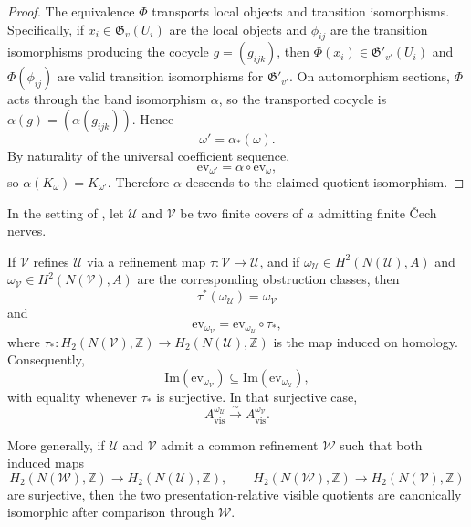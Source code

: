 \begin{proof}
The equivalence $\Phi$ transports local objects and transition isomorphisms. Specifically, if $x_i\in\mathfrak G_v(U_i)$ are the local objects and $\phi_{ij}$ are the transition isomorphisms producing the cocycle $g=(g_{ijk})$, then $\Phi(x_i)\in\mathfrak G'_{v'}(U_i)$ and $\Phi(\phi_{ij})$ are valid transition isomorphisms for $\mathfrak G'_{v'}$. On automorphism sections, $\Phi$ acts through the band isomorphism $\alpha$, so the transported cocycle is $\alpha(g)=(\alpha(g_{ijk}))$. Hence
\[
\omega'=\alpha_*(\omega).
\]
By naturality of the universal coefficient sequence,
\[
\mathrm{ev}_{\omega'}=\alpha\circ \mathrm{ev}_{\omega},
\]
so $\alpha(K_{\omega})=K_{\omega'}$. Therefore $\alpha$ descends to the claimed quotient isomorphism.
\end{proof}

\begin{proposition}\label{prop:visible-quotient-refinement-invariance}
In the setting of , let $\mathcal U$ and $\mathcal V$ be two finite covers of $a$ admitting finite \v{C}ech nerves.

If $\mathcal V$ refines $\mathcal U$ via a refinement map $\tau:\mathcal V\to\mathcal U$, and if $\omega_{\mathcal U}\in H^2(N(\mathcal U),A)$ and $\omega_{\mathcal V}\in H^2(N(\mathcal V),A)$ are the corresponding obstruction classes, then
\[
\tau^*(\omega_{\mathcal U})=\omega_{\mathcal V}
\]
and
\[
\mathrm{ev}_{\omega_{\mathcal V}}=\mathrm{ev}_{\omega_{\mathcal U}}\circ \tau_*,
\]
where $\tau_*:H_2(N(\mathcal V),\mathbb Z)\to H_2(N(\mathcal U),\mathbb Z)$ is the map induced on homology. Consequently,
\[
\mathrm{Im}(\mathrm{ev}_{\omega_{\mathcal V}})\subseteq \mathrm{Im}(\mathrm{ev}_{\omega_{\mathcal U}}),
\]
with equality whenever $\tau_*$ is surjective. In that surjective case,
\[
A_{\mathrm{vis}}^{\omega_{\mathcal U}}\xrightarrow{\sim}A_{\mathrm{vis}}^{\omega_{\mathcal V}}.
\]

More generally, if $\mathcal U$ and $\mathcal V$ admit a common refinement $\mathcal W$ such that both induced maps
\[
H_2(N(\mathcal W),\mathbb Z)\to H_2(N(\mathcal U),\mathbb Z),
\qquad
H_2(N(\mathcal W),\mathbb Z)\to H_2(N(\mathcal V),\mathbb Z)
\]
are surjective, then the two presentation-relative visible quotients are canonically isomorphic after comparison through $\mathcal W$.
\end{proposition}

